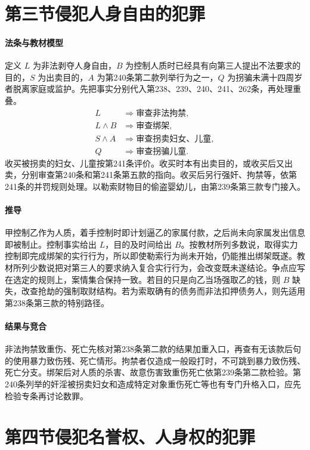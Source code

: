 \section{第三节\quad 侵犯人身自由的犯罪}

\paragraph{法条与教材模型}
定义 $L$ 为非法剥夺人身自由，$B$ 为控制人质时已经具有向第三人提出不法要求的目的，$S$ 为出卖目的，$A$ 为第240条第二款列举行为之一，$Q$ 为拐骗未满十四周岁者脱离家庭或监护。先把事实分别代入第238、239、240、241、262条，再处理重叠。
\[
\begin{aligned}
 L&\Longrightarrow \text{审查非法拘禁},\\
 L\land B&\Longrightarrow \text{审查绑架},\\
 S\land A&\Longrightarrow \text{审查拐卖妇女、儿童},\\
 Q&\Longrightarrow \text{审查拐骗儿童}.
\end{aligned}
\]
收买被拐卖的妇女、儿童按第241条评价。收买时本有出卖目的，或收买后又出卖，分别审查第240条和第241条第五款的指向。收买后另行强奸、拘禁等，依第241条的并罚规则处理。以勒索财物目的偷盗婴幼儿，由第239条第三款专门接入。

\paragraph{推导}
甲控制乙作为人质，着手控制时即计划逼乙的家属付款，之后尚未向家属发出信息即被制止。控制事实给出 $L$，目的及时间给出 $B$。按教材所列多数说，取得实力控制即完成绑架的实行行为，所以即使勒索行为尚未开始，仍能推出绑架既遂。教材所列少数说把对第三人的要求纳入复合实行行为，会改变既未遂结论。争点应写在选定的规则上，案情集合保持一致。若目的只是向乙当场强取乙的钱，则 $B$ 缺失，改查抢劫的强制取财结构。若为索取确有的债务而非法扣押债务人，则先适用第238条第三款的特别路径。

\paragraph{结果与竞合}
非法拘禁致重伤、死亡先核对第238条第二款的结果加重入口，再查有无该款后句的使用暴力致伤残、死亡情形。拘禁者仅造成一般殴打时，不可跳到暴力致伤残、死亡分支。绑架后对人质的杀害、故意伤害致重伤死亡依第239条第二款检验。第240条列举的奸淫被拐卖妇女和造成特定对象重伤死亡等也有专门升格入口，应先检验专条再讨论数罪。

\section{第四节\quad 侵犯名誉权、人身权的犯罪}

